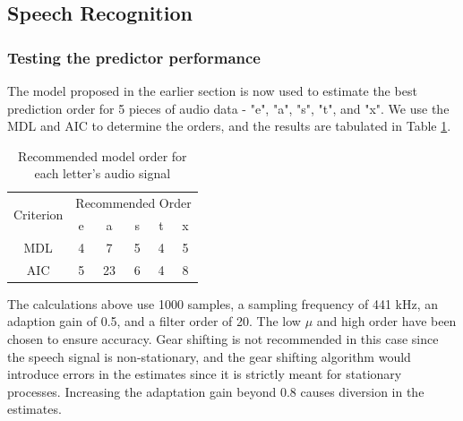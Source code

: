 \documentclass{article}
\begin{document}
\subsection{Speech Recognition}

\subsubsection{Testing the predictor performance}

The model proposed in the earlier section is now used to estimate the best prediction order for 5 pieces of audio data - "e", "a", "s", "t", and "x". We use the MDL and AIC to determine the orders, and the results are tabulated in Table \ref{tab:speech_mdl}.

\begin{table}[h!]
\centering
\begin{tabular}{|c|c|c|c|c|c|}
\hline
\multirow{2}{*}{Criterion} & \multicolumn{5}{c|}{Recommended Order} \\ \cline{2-6} 
                           & e      & a     & s     & t     & x     \\ \hline
MDL                        & 4      & 7     & 5     & 4     & 5     \\ \hline
AIC                        & 5      & 23     & 6     & 4     & 8     \\ \hline
\end{tabular}
\caption{Recommended model order for each letter's audio signal}
\label{tab:speech_mdl}
\end{table}

The calculations above use 1000 samples, a sampling frequency of 441 kHz, an adaption gain of 0.5, and a filter order of 20. The low $\mu$ and high order have been chosen to ensure accuracy. Gear shifting is not recommended in this case since the speech signal is non-stationary, and the gear shifting algorithm would introduce errors in the estimates since it is strictly meant for stationary processes. Increasing the adaptation gain beyond 0.8 causes diversion in the estimates.
\end{document}
